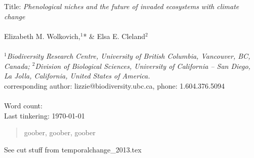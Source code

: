 \documentclass[11pt,a4paper,oneside]{article}
\begin{document}


\noindent Title: \emph{Phenological niches and the future of invaded ecosystems with climate change}\\
\\
\noindent Elizabeth M. Wolkovich,$^{1}$* \& Elsa E. Cleland$^{2}$ \\
\\
\noindent \emph{$^{1}$Biodiversity Research Centre, University of British Columbia, Vancouver, BC, Canada; $^{2}$Division of Biological Sciences, University of
  California -- San Diego, La Jolla, California, United States of America.}\\
\noindent *corresponding author: lizzie@biodiversity.ubc.ca, phone: 1.604.376.5094\\
\\
\noindent Word count: \\
\noindent Last tinkering: \today 
\\
\begin{abstract} goober, goober, goober
\end{abstract}


\newpage
\linenumbers

See cut stuff from temporalchange_2013.tex

\newpage

\end{document}
